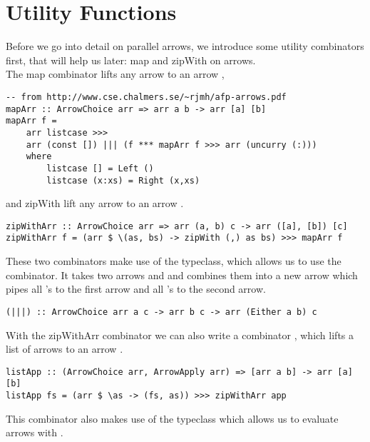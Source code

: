 \section{Utility Functions}\label{utilfns}
Before we go into detail on parallel arrows, we introduce some utility combinators first, that will help us later: map and zipWith on arrows.
\\
The map combinator lifts any arrow  to an arrow ,
\begin{lstlisting}[frame=htrbl]
-- from http://www.cse.chalmers.se/~rjmh/afp-arrows.pdf
mapArr :: ArrowChoice arr => arr a b -> arr [a] [b]
mapArr f =
	arr listcase >>>
	arr (const []) ||| (f *** mapArr f >>> arr (uncurry (:)))
	where
		listcase [] = Left ()
		listcase (x:xs) = Right (x,xs)
\end{lstlisting}
and zipWith lift any arrow  to an arrow .
\begin{lstlisting}[frame=htrbl]
zipWithArr :: ArrowChoice arr => arr (a, b) c -> arr ([a], [b]) [c]
zipWithArr f = (arr $ \(as, bs) -> zipWith (,) as bs) >>> mapArr f
\end{lstlisting}
These two combinators make use of the  typeclass, which allows us to use the \code{|||} combinator. It takes two arrows  and  and combines them into a new arrow  which pipes all 's to the first arrow and all 's to the second arrow.
\begin{lstlisting}[frame=htrbl]
(|||) :: ArrowChoice arr a c -> arr b c -> arr (Either a b) c
\end{lstlisting}
With the zipWithArr combinator we can also write a combinator , which lifts a list of arrows \code{[arr a b]} to an arrow .
\begin{lstlisting}[frame=htrbl]
listApp :: (ArrowChoice arr, ArrowApply arr) => [arr a b] -> arr [a] [b]
listApp fs = (arr $ \as -> (fs, as)) >>> zipWithArr app
\end{lstlisting}
This combinator also makes use of the  typeclass which allows us to evaluate arrows with .
